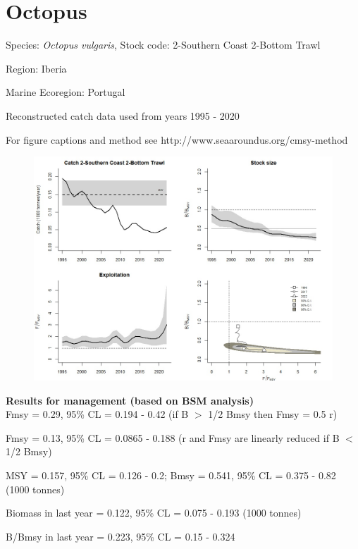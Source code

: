 \documentclass[12pt,a4paper]{article}\usepackage[]{graphicx}\usepackage[]{xcolor}
\begin{document}
    \section*{Octopus}


    Species: \emph{Octopus vulgaris}, Stock code: 2-Southern Coast 2-Bottom Trawl

Region: Iberia

Marine Ecoregion: Portugal

Reconstructed catch data used from years 1995 - 2020 

 For figure captions and method see http://www.seaaroundus.org/cmsy-method

    \begin{figure}[ht]
    \centering
    \includegraphics[width=1.00\textwidth ext=.jpg type=jpg]{2-Southern Coast 2-Bottom Trawl_MAN.jpg}
    \end{figure}

    \textbf{Results for management (based on BSM analysis)}\\

Fmsy = 0.29, 95\% CL = 0.194 - 0.42 (if B $>$ 1/2 Bmsy then Fmsy = 0.5 r)

Fmsy = 0.13, 95\% CL = 0.0865 - 0.188 (r and Fmsy are linearly reduced if B $<$ 1/2 Bmsy)

MSY = 0.157,  95\% CL = 0.126 - 0.2; Bmsy = 0.541,  95\% CL = 0.375 - 0.82 (1000 tonnes)

Biomass in last year = 0.122, 95\% CL = 0.075 - 0.193 (1000 tonnes)

B/Bmsy in last year = 0.223, 95\% CL = 0.15 - 0.324
\end{document}
